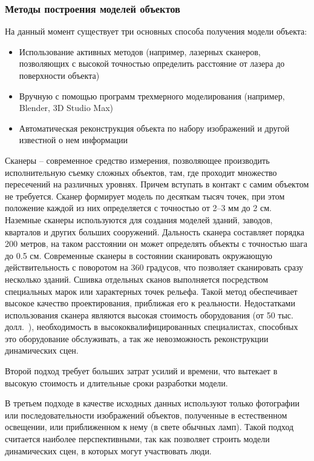 \subsubsection{Методы построения моделей объектов}
На данный момент существует три основных способа получения модели объекта:
\begin{itemize}
\item Использование активных методов (например, лазерных сканеров, позволяющих с высокой точностью определить расстояние от лазера до поверхности объекта)
\item Вручную с помощью программ трехмерного моделирования (например, Blender, 3D Studio Max)
\item Автоматическая реконструкция объекта по набору изображений и другой известной о нем информации
\end{itemize}

Сканеры -- современное средство измерения, позволяющее производить исполнительную съемку сложных объектов, там, где проходит множество пересечений на различных уровнях. Причем вступать в контакт с самим объектом не требуется. Сканер формирует модель по десяткам тысяч точек, при этом положение каждой из них определяется с точностью от 2--3 мм до 2 см. Наземные сканеры используются для создания моделей зданий, заводов, кварталов и других больших сооружений. Дальность сканера составляет порядка 200 метров, на таком расстоянии он может определять объекты с точностью шага до 0.5 см. Современные сканеры в состоянии сканировать окружающую действительность с поворотом на 360 градусов, что позволяет сканировать сразу несколько зданий. Сшивка отдельных сканов выполняется посредством специальных марок или характерных точек рельефа. Такой метод обеспечивает высокое качество проектирования, приближая его к реальности. Недостатками использования сканера являются высокая стоимость оборудования (от 50 тыс. долл.~\cite{laser_scanner}), необходимость в высококвалифицированных специалистах, способных это оборудование обслуживать, а так же невозможность реконструкции динамических сцен.~\cite{komarova_voxel_coloring}

Второй подход требует больших затрат усилий и времени, что вытекает в высокую стоимость и длительные сроки разработки модели.

В третьем подходе в качестве исходных данных используют только фотографии или последовательности изображений объектов, полученные в естественном освещении, или приближенном к нему (в свете обычных ламп). Такой подход считается наиболее перспективными, так как позволяет строить модели динамических сцен, в которых могут участвовать люди.

